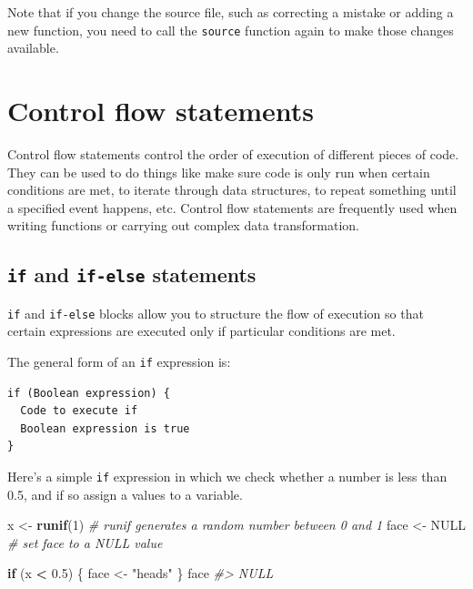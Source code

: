\documentclass[]{book}
\newenvironment{Shaded}{\begin{snugshade}}{\end{snugshade}}
\newcommand{\CommentTok}[1]{\textcolor[rgb]{0.56,0.35,0.01}{\textit{#1}}}
\newcommand{\ControlFlowTok}[1]{\textcolor[rgb]{0.13,0.29,0.53}{\textbf{#1}}}
\newcommand{\DecValTok}[1]{\textcolor[rgb]{0.00,0.00,0.81}{#1}}
\newcommand{\FloatTok}[1]{\textcolor[rgb]{0.00,0.00,0.81}{#1}}
\newcommand{\KeywordTok}[1]{\textcolor[rgb]{0.13,0.29,0.53}{\textbf{#1}}}
\newcommand{\NormalTok}[1]{#1}
\newcommand{\OperatorTok}[1]{\textcolor[rgb]{0.81,0.36,0.00}{\textbf{#1}}}
\newcommand{\OtherTok}[1]{\textcolor[rgb]{0.56,0.35,0.01}{#1}}
\newcommand{\StringTok}[1]{\textcolor[rgb]{0.31,0.60,0.02}{#1}}
\theoremstyle{definition}
\theoremstyle{definition}
\theoremstyle{definition}
\theoremstyle{remark}
\begin{document}
Note that if you change the source file, such as correcting a mistake or
adding a new function, you need to call the \texttt{source} function
again to make those changes available.

\hypertarget{control-flow-statements}{%
\section{Control flow statements}\label{control-flow-statements}}

Control flow statements control the order of execution of different
pieces of code. They can be used to do things like make sure code is
only run when certain conditions are met, to iterate through data
structures, to repeat something until a specified event happens, etc.
Control flow statements are frequently used when writing functions or
carrying out complex data transformation.

\hypertarget{if-and-if-else-statements}{%
\subsection{\texorpdfstring{\texttt{if} and \texttt{if-else}
statements}{if and if-else statements}}\label{if-and-if-else-statements}}

\texttt{if} and \texttt{if-else} blocks allow you to structure the flow
of execution so that certain expressions are executed only if particular
conditions are met.

The general form of an \texttt{if} expression is:

\begin{verbatim}
if (Boolean expression) {
  Code to execute if 
  Boolean expression is true
}
\end{verbatim}

Here's a simple \texttt{if} expression in which we check whether a
number is less than 0.5, and if so assign a values to a variable.

\begin{Shaded}
\begin{Highlighting}[]
\NormalTok{x <-}\StringTok{ }\KeywordTok{runif}\NormalTok{(}\DecValTok{1}\NormalTok{)  }\CommentTok{# runif generates a random number between 0 and 1}
\NormalTok{face <-}\StringTok{ }\OtherTok{NULL}  \CommentTok{# set face to a NULL value}

\ControlFlowTok{if}\NormalTok{ (x }\OperatorTok{<}\StringTok{ }\FloatTok{0.5}\NormalTok{) \{}
\NormalTok{  face <-}\StringTok{ "heads"}
\NormalTok{\}}
\NormalTok{face}
\CommentTok{#> NULL}
\end{Highlighting}
\end{Shaded}
\end{document}

